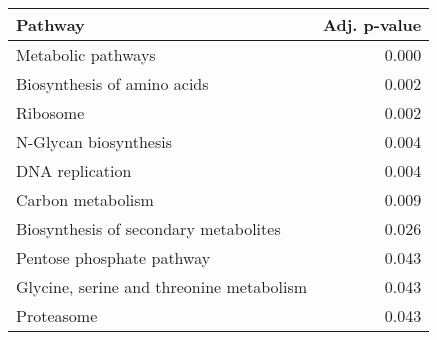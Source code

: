 \begin{tabular}{lr}
\toprule
                                  Pathway &  Adj. p-value \\
\midrule
                       Metabolic pathways &         0.000 \\
              Biosynthesis of amino acids &         0.002 \\
                                 Ribosome &         0.002 \\
                    N-Glycan biosynthesis &         0.004 \\
                          DNA replication &         0.004 \\
                        Carbon metabolism &         0.009 \\
    Biosynthesis of secondary metabolites &         0.026 \\
                Pentose phosphate pathway &         0.043 \\
 Glycine, serine and threonine metabolism &         0.043 \\
                               Proteasome &         0.043 \\
\bottomrule
\end{tabular}
